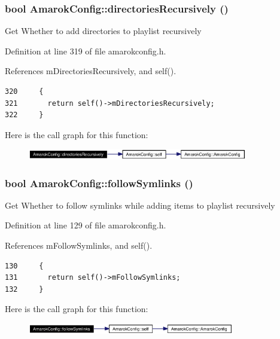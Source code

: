 \subsubsection{\setlength{\rightskip}{0pt plus 5cm}bool Amarok\-Config::directories\-Recursively ()\hspace{0.3cm}{\tt  [inline, static]}}\label{classAmarokConfig_AmarokConfige32}


Get Whether to add directories to playlist recursively 

Definition at line 319 of file amarokconfig.h.

References m\-Directories\-Recursively, and self().



\footnotesize\begin{verbatim}320     {
321       return self()->mDirectoriesRecursively;
322     }
\end{verbatim}\normalsize 


Here is the call graph for this function:\begin{figure}[H]
\begin{center}
\leavevmode
\includegraphics[width=272pt]{classAmarokConfig_AmarokConfige32_cgraph}
\end{center}
\end{figure}
\subsubsection{\setlength{\rightskip}{0pt plus 5cm}bool Amarok\-Config::follow\-Symlinks ()\hspace{0.3cm}{\tt  [inline, static]}}\label{classAmarokConfig_AmarokConfige12}


Get Whether to follow symlinks while adding items to playlist recursively 

Definition at line 129 of file amarokconfig.h.

References m\-Follow\-Symlinks, and self().



\footnotesize\begin{verbatim}130     {
131       return self()->mFollowSymlinks;
132     }
\end{verbatim}\normalsize 


Here is the call graph for this function:\begin{figure}[H]
\begin{center}
\leavevmode
\includegraphics[width=256pt]{classAmarokConfig_AmarokConfige12_cgraph}
\end{center}
\end{figure}
